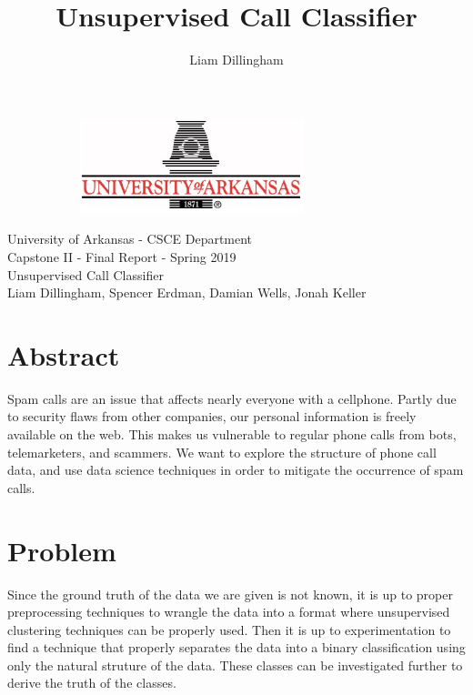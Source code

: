 \documentclass[20pt]{article} %
\title{Unsupervised Call Classifier}
\author{Liam Dillingham}
\begin{document}
\begin{figure}[!htbp]
  	\centering
   	\begin{subfigure}[p]{0.5\linewidth}
    	\includegraphics[width=\linewidth]{../figures/uofa.png}
   	\end{subfigure}
\end{figure} 
\begin{center}
\LARGE University of Arkansas - CSCE Department\\
\LARGE Capstone II - Final Report - Spring 2019\\ 
\LARGE Unsupervised Call Classifier\\ 
\Large Liam Dillingham, Spencer Erdman, Damian Wells, Jonah Keller
\end{center}

\section{Abstract}
Spam calls are an issue that affects nearly everyone with a cellphone.  Partly due to security flaws from other companies, our personal information is freely available on the web.  This makes us vulnerable to regular phone calls from bots, telemarketers, and scammers.  
We want to explore the structure of phone call data, and use data science techniques in order to mitigate the occurrence of spam calls.

\section{Problem}
Since the ground truth of the data we are given is not known, it is up to proper preprocessing techniques to wrangle the data into a format where unsupervised clustering techniques can be properly used.  Then it is up to experimentation to find a technique that properly separates the data into a binary classification using only the natural struture of the data.  These classes can be investigated further to derive the truth of the classes.
\end{document}
